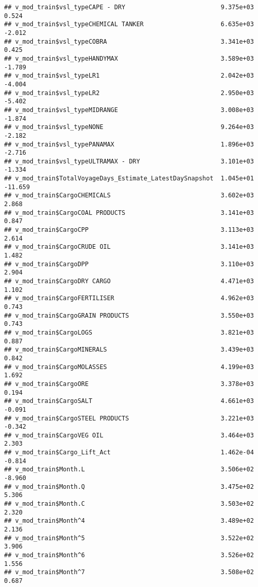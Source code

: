 \documentclass[]{article}
\begin{document}
\begin{verbatim}
## v_mod_train$vsl_typeCAPE - DRY                          9.375e+03   0.524
## v_mod_train$vsl_typeCHEMICAL TANKER                     6.635e+03  -2.012
## v_mod_train$vsl_typeCOBRA                               3.341e+03   0.425
## v_mod_train$vsl_typeHANDYMAX                            3.589e+03  -1.789
## v_mod_train$vsl_typeLR1                                 2.042e+03  -4.004
## v_mod_train$vsl_typeLR2                                 2.950e+03  -5.402
## v_mod_train$vsl_typeMIDRANGE                            3.008e+03  -1.874
## v_mod_train$vsl_typeNONE                                9.264e+03  -2.182
## v_mod_train$vsl_typePANAMAX                             1.896e+03  -2.716
## v_mod_train$vsl_typeULTRAMAX - DRY                      3.101e+03  -1.334
## v_mod_train$TotalVoyageDays_Estimate_LatestDaySnapshot  1.045e+01 -11.659
## v_mod_train$CargoCHEMICALS                              3.602e+03   2.868
## v_mod_train$CargoCOAL PRODUCTS                          3.141e+03   0.847
## v_mod_train$CargoCPP                                    3.113e+03   2.614
## v_mod_train$CargoCRUDE OIL                              3.141e+03   1.482
## v_mod_train$CargoDPP                                    3.110e+03   2.904
## v_mod_train$CargoDRY CARGO                              4.471e+03   1.102
## v_mod_train$CargoFERTILISER                             4.962e+03   0.743
## v_mod_train$CargoGRAIN PRODUCTS                         3.550e+03   0.743
## v_mod_train$CargoLOGS                                   3.821e+03   0.887
## v_mod_train$CargoMINERALS                               3.439e+03   0.842
## v_mod_train$CargoMOLASSES                               4.199e+03   1.692
## v_mod_train$CargoORE                                    3.378e+03   0.194
## v_mod_train$CargoSALT                                   4.661e+03  -0.091
## v_mod_train$CargoSTEEL PRODUCTS                         3.221e+03  -0.342
## v_mod_train$CargoVEG OIL                                3.464e+03   2.303
## v_mod_train$Cargo_Lift_Act                              1.462e-04  -0.814
## v_mod_train$Month.L                                     3.506e+02  -8.960
## v_mod_train$Month.Q                                     3.475e+02   5.306
## v_mod_train$Month.C                                     3.503e+02   2.320
## v_mod_train$Month^4                                     3.489e+02   2.136
## v_mod_train$Month^5                                     3.522e+02   3.906
## v_mod_train$Month^6                                     3.526e+02   1.556
## v_mod_train$Month^7                                     3.508e+02   0.687

\end{verbatim}
\end{document}
